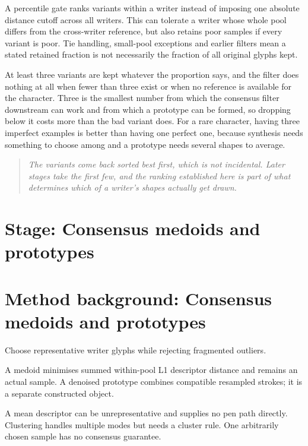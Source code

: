 A percentile gate ranks variants within a writer instead of imposing one absolute distance cutoff across all writers. This can tolerate a writer whose whole pool differs from the cross-writer reference, but also retains poor samples if every variant is poor. Tie handling, small-pool exceptions and earlier filters mean a stated retained fraction is not necessarily the fraction of all original glyphs kept.


At least three variants are kept whatever the proportion says, and the filter does nothing at all when fewer than three exist or when no reference is available for the character. Three is the smallest number from which the consensus filter downstream can work and from which a prototype can be formed, so dropping below it costs more than the bad variant does. For a rare character, having three imperfect examples is better than having one perfect one, because synthesis needs something to choose among and a prototype needs several shapes to average.


\begin{quote}\small\itshape The variants come back sorted best first, which is not incidental. Later stages take the first few, and the ranking established here is part of what determines which of a writer's shapes actually get drawn.\end{quote}


\section*{Stage: Consensus medoids and prototypes}
\section{Method background: Consensus medoids and prototypes}\label{method:medoid}
Choose representative writer glyphs while rejecting fragmented outliers.


A medoid minimises summed within-pool L1 descriptor distance and remains an actual sample. A denoised prototype combines compatible resampled strokes; it is a separate constructed object.


A mean descriptor can be unrepresentative and supplies no pen path directly. Clustering handles multiple modes but needs a cluster rule. One arbitrarily chosen sample has no consensus guarantee.


